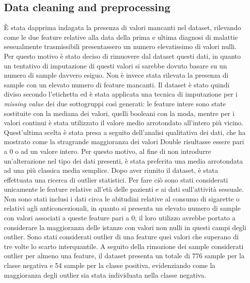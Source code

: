 \subsection{Data cleaning and preprocessing}
È stata dapprima indagata la presenza di valori mancanti nel dataset, rilevando come le due feature relative alla data della prima e ultima diagnosi di malattie sessualmente trasmissibili presentassero un numero elevatissimo di valori nulli.
Per questo motivo è stato deciso di rimuovere dal dataset questi dati, in quanto un tentativo di imputazione di questi valori si sarebbe dovuto basare su un numero di sample davvero esiguo. Non è invece stata rilevata la presenza di sample con un elevato numero di feature mancanti.
Il dataset è stato quindi diviso secondo l'etichetta ed è stata applicata una tecnica di imputazione per i \textit{missing value} dei due sottogruppi così generati: le feature intere sono state sostituite con la mediana dei valori, quelli booleani con la moda, mentre per i valori continui è stata utilizzato il valore medio arrotondato all'intero più vicino. Quest'ultima scelta è stata presa a seguito dell'analisi qualitativa dei dati, che ha mostrato come la stragrande maggioranza dei valori Double risultasse essere pari a 0 o ad un valore intero. Per questo motivo, al fine di non introdurre un'alterazione nel tipo dei dati presenti, è stata preferita una media arrotondata ad una più classica media semplice.
Dopo aver riunito il dataset, è stata effettuata una ricerca di outlier statistici.
Per fare ciò sono stati considerati unicamente le feature relative all'età delle pazienti e ai dati sull'attività sessuale. Non sono stati inclusi i dati circa le abitudini relative al consumo di sigarette o relativi agli anticoncezionali, in quanto si presenta un elevato numero di sample con valori associati a queste feature pari a $0$; il loro utilizzo avrebbe portato a considerare la maggioranza delle istanze con valori non nulli in questi campi degli outlier. Sono stati considerati outlier di una feature quei valori che superano di tre volte lo scarto interquantile. 
A seguito della rimozione dei sample considerati outlier per almeno una feature, il dataset presenta un totale di 776 sample per la classe negativa e 54 sample per la classe positiva, evidenziando come la maggioranza degli outlier sia stata individuata nella classe negativa.